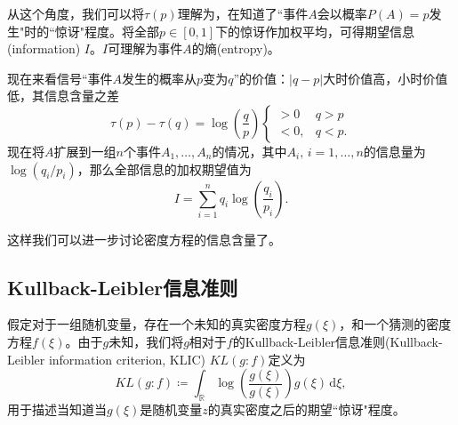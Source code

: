 从这个角度，我们可以将$\tau(p)$理解为，在知道了``事件$A$会以概率$P(A)=p$发生"时的``惊讶"程度。将全部$p \in [0,1]$下的惊讶作加权平均，可得期望信息(information) $I$。$I$可理解为事件$A$的熵(entropy)。

现在来看信号``事件$A$发生的概率从$p$变为$q$''的价值：$\left| q-p \right|$大时价值高，小时价值低，其信息含量之差
\begin{equation*}
    \tau (p) - \tau(q) = \log \left( \frac{q}{p} \right)
    \begin{cases}
        > 0 & q > p \\
        <0, & q < p.
    \end{cases}
\end{equation*}
现在将$A$扩展到一组$n$个事件$A_{1},\ldots,A_{n}$的情况，其中$A_{i}, \, i=1,\ldots,n$的信息量为$\log \left( q_{i}/p_{i} \right)$，那么全部信息的加权期望值为
\begin{equation*}
    I = \sum_{i=1}^{n} q_{i} \log \left( \frac{q_{i}}{p_{i}} \right).
\end{equation*}

这样我们可以进一步讨论密度方程的信息含量了。

\subsection{Kullback-Leibler信息准则}
\label{sec:qmle-klic}
假定对于一组随机变量，存在一个未知的真实密度方程$g(\xi)$，和一个猜测的密度方程$f(\xi)$。由于$g$未知，我们将$g$相对于$f$的Kullback-Leibler信息准则(Kullback-Leibler information criterion, KLIC) $KL \left( g:f \right)$定义为
\begin{equation}
    \label{eq:qmle-klic-def}
    KL \left( g:f \right)
    \coloneqq \int_{\mathbb{R}} \log
    \left(
    \frac{g \left( \xi \right)}{g \left( \xi \right)}
    \right)
    g \left( \xi \right)
    \, \mathrm{d} \xi,
\end{equation}
用于描述当知道当$g \left( \xi \right)$是随机变量$z$的真实密度之后的期望``惊讶"程度。

